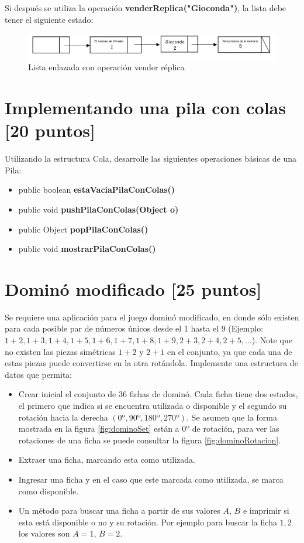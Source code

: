 \documentclass[twocolumn]{article}
\begin{document}
Si después se utiliza la operación \textbf{venderReplica("Gioconda")}, la lista debe tener el siguiente estado:

\begin{figure}[H]
	\centering
	\includegraphics[scale=0.35]{ListaEnlazadaOp3.jpg}
	\caption{Lista enlazada con operación vender réplica}
\end{figure}

\section{Implementando una pila con colas \small{[20 puntos]}}

Utilizando la estructura Cola, desarrolle las siguientes operaciones básicas de una Pila:

\begin{itemize}
	\item public boolean \textbf{estaVaciaPilaConColas()}
	\item public void \textbf{pushPilaConColas(Object o)}
	\item public Object \textbf{popPilaConColas()}
	\item public void \textbf{mostrarPilaConColas()}
\end{itemize}

\section{Dominó modificado \small{[25 puntos]}}

Se requiere una aplicación para el juego dominó modificado, en donde sólo existen para cada posible par de números únicos desde el 1 hasta el 9 (Ejemplo: $1+2, 1+3, 1+4, 1+5, 1+6, 1+7, 1+8, 1+9, 2+3, 2+4, 2+5, . . . $). Note que no existen las piezas simétricas $1+2$ y $2+1$ en el conjunto, ya que cada una de estas piezas puede convertirse en la otra rotándola. Implemente una estructura de datos que permita:

\begin{itemize}
	\item Crear inicial el conjunto de 36 fichas de dominó. Cada ficha tiene dos estados, el primero que indica si se encuentra utilizada o disponible y el segundo su rotación hacia la derecha $(0º,90º,180º,270º)$. Se asumen que la forma mostrada en la figura \ref{fig:dominoSet} están a $0º$ de rotación, para ver las rotaciones de una ficha se puede consultar la figura \ref{fig:dominoRotacion}.
	\item Extraer una ficha, marcando esta como utilizada.
	\item Ingresar una ficha y en el caso que este marcada como utilizada, se marca como disponible.
	\item Un método para buscar una ficha a partir de sus valores $A$, $B$ e imprimir si esta está disponible o no y su rotación. Por ejemplo para buscar la ficha $1,2$ los valores son $A=1$, $B=2$. 
\end{itemize}
\end{document}
